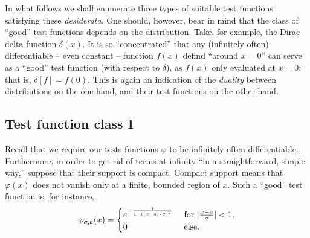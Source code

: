 In what follows we shall enumerate three types of suitable test functions satisfying these {\it desiderata}.
One should, however, bear in mind that the class of ``good'' test functions depends on the distribution.
Take, for example, the Dirac delta function $\delta (x)$. It is so ``concentrated'' that any (infinitely often)
differentiable -- even constant -- function $f(x)$ defind ``around $x=0$''
can serve as a ``good'' test function (with respect to $\delta$),
as $f(x)$ only evaluated at $x=0$; that is, $\delta[f]=f(0)$.
This is again an indication of the {\em duality} between distributions on the one hand,
and their test functions on the other hand.

\subsection{Test function class I}

Recall that we require \cite{schwartz} our tests functions $\varphi$
to be infinitely often differentiable. Furthermore, in order to get rid of terms at infinity ``in a straightforward, simple way,''
suppose that their support is compact.
Compact support means that $\varphi (x)$ does not vanish only at a finite, bounded region of $x$.
Such a ``good'' test function is, for instance,
\begin{equation}
\varphi_{\sigma ,a}(x)
=
\begin{cases}
e^{-{1\over 1-((x-a)/\sigma )^2}} & \textrm{ for } \vert  {x-a\over \sigma }\vert <1, \\
                                0 & \textrm{ else.}
\end{cases}
\end{equation}

